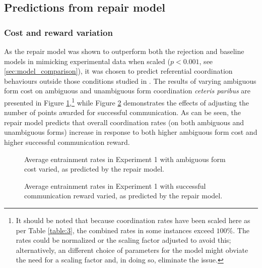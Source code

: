 \documentclass[12pt,a4paper]{article}
\begin{document}
\subsection{Predictions from repair model}
\subsubsection{Cost and reward variation}
As the repair model was shown to outperform both the rejection and baseline models in mimicking experimental data when scaled ($p<0.001$, see \ref{sec:model_comparison}), it was chosen to predict referential coordination behaviours outside those conditions studied in \citeauthor{rohde2012}. The results of varying ambiguous form cost on ambiguous and unambiguous form coordination \textit{ceteris paribus} are presented in Figure \ref{fig:3},\footnote{It should be noted that because coordination rates have been scaled here as per Table \ref{table:3}, the combined rates in some instances exceed $100\%$. The rates could be normalized or the scaling factor adjusted to avoid this; alternatively, an different choice of parameters for the model might obviate the need for a scaling factor and, in doing so, eliminate the issue.} while Figure \ref{fig:4} demonstrates the effects of adjusting the number of points awarded for successful communication. As can be seen, the repair model predicts that overall coordination rates (on both ambiguous and unambiguous forms) increase in response to both higher ambiguous form cost and higher successful communication reward.

\begin{figure}
\centering
\scalebox{.65}{}
\caption{Average entrainment rates in Experiment 1 with ambiguous form cost varied, as predicted by the repair model.}
\label{fig:3}
\end{figure}

\begin{figure}
\centering
\scalebox{.65}{}
\caption{Average entrainment rates in Experiment 1 with successful communication reward varied, as predicted by the repair model.}
\label{fig:4}
\end{figure}
\end{document}
